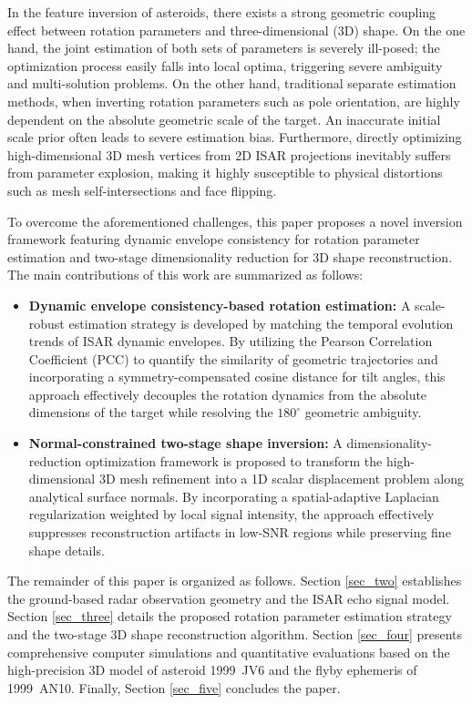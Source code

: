 \documentclass[conference]{IEEEtran}
\begin{document}
In the feature inversion of asteroids, there exists a strong geometric coupling effect between rotation parameters and three-dimensional (3D) shape\cite{wang2023}. On the one hand, the joint estimation of both sets of parameters is severely ill-posed; the optimization process easily falls into local optima, triggering severe ambiguity and multi-solution problems. On the other hand, traditional separate estimation methods, when inverting rotation parameters such as pole orientation, are highly dependent on the absolute geometric scale of the target. An inaccurate initial scale prior often leads to severe estimation bias. Furthermore, directly optimizing high-dimensional 3D mesh vertices from 2D ISAR projections inevitably suffers from parameter explosion, making it highly susceptible to physical distortions such as mesh self-intersections and face flipping. 

To overcome the aforementioned challenges, this paper proposes a novel inversion framework featuring dynamic envelope consistency for rotation parameter estimation and two-stage dimensionality reduction for 3D shape reconstruction. The main contributions of this work are summarized as follows:

\begin{itemize}
	\item \textbf{Dynamic envelope consistency-based rotation estimation:} A scale-robust estimation strategy is developed by matching the temporal evolution trends of ISAR dynamic envelopes. By utilizing the Pearson Correlation Coefficient (PCC) to quantify the similarity of geometric trajectories and incorporating a symmetry-compensated cosine distance for tilt angles, this approach effectively decouples the rotation dynamics from the absolute dimensions of the target while resolving the $180^\circ$ geometric ambiguity.
	
	\item \textbf{Normal-constrained two-stage shape inversion:} A dimensionality-reduction optimization framework is proposed to transform the high-dimensional 3D mesh refinement into a 1D scalar displacement problem along analytical surface normals. By incorporating a spatial-adaptive Laplacian regularization weighted by local signal intensity, the approach effectively suppresses reconstruction artifacts in low-SNR regions while preserving fine shape details.
\end{itemize}

The remainder of this paper is organized as follows. Section \ref{sec_two} establishes the ground-based radar observation geometry and the ISAR echo signal model. Section \ref{sec_three} details the proposed rotation parameter estimation strategy and the two-stage 3D shape reconstruction algorithm. Section \ref{sec_four} presents comprehensive computer simulations and quantitative evaluations based on the high-precision 3D model of asteroid 1999~JV6 and the flyby ephemeris of 1999~AN10. Finally, Section \ref{sec_five} concludes the paper.
\end{document}
